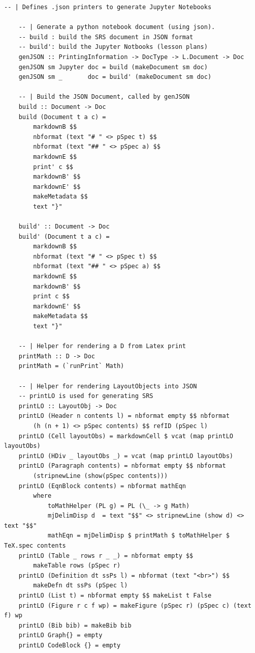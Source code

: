 \begin{lstlisting}[language=haskell1, 
	basicstyle=\linespread{1.1}\small\ttfamily]
	-- | Defines .json printers to generate Jupyter Notebooks
	
	-- | Generate a python notebook document (using json).
	-- build : build the SRS document in JSON format
	-- build': build the Jupyter Notbooks (lesson plans)
	genJSON :: PrintingInformation -> DocType -> L.Document -> Doc
	genJSON sm Jupyter doc = build (makeDocument sm doc)
	genJSON sm _       doc = build' (makeDocument sm doc)
		
	-- | Build the JSON Document, called by genJSON
	build :: Document -> Doc
	build (Document t a c) = 
		markdownB $$
		nbformat (text "# " <> pSpec t) $$
		nbformat (text "## " <> pSpec a) $$
		markdownE $$
		print' c $$
		markdownB' $$
		markdownE' $$
		makeMetadata $$
		text "}" 

	build' :: Document -> Doc
	build' (Document t a c) = 
		markdownB $$
		nbformat (text "# " <> pSpec t) $$
		nbformat (text "## " <> pSpec a) $$
		markdownE $$
		markdownB' $$ 
		print c $$
		markdownE' $$
		makeMetadata $$
		text "}" 

	-- | Helper for rendering a D from Latex print
	printMath :: D -> Doc
	printMath = (`runPrint` Math)
		
	-- | Helper for rendering LayoutObjects into JSON
	-- printLO is used for generating SRS
	printLO :: LayoutObj -> Doc
	printLO (Header n contents l) = nbformat empty $$ nbformat 
		(h (n + 1) <> pSpec contents) $$ refID (pSpec l)
	printLO (Cell layoutObs) = markdownCell $ vcat (map printLO layoutObs)
	printLO (HDiv _ layoutObs _) = vcat (map printLO layoutObs)
	printLO (Paragraph contents) = nbformat empty $$ nbformat 
		(stripnewLine (show(pSpec contents)))
	printLO (EqnBlock contents) = nbformat mathEqn
		where
			toMathHelper (PL g) = PL (\_ -> g Math)
			mjDelimDisp d  = text "$$" <> stripnewLine (show d) <> text "$$" 
			mathEqn = mjDelimDisp $ printMath $ toMathHelper $ TeX.spec contents
	printLO (Table _ rows r _ _) = nbformat empty $$ 
		makeTable rows (pSpec r)
	printLO (Definition dt ssPs l) = nbformat (text "<br>") $$ 
		makeDefn dt ssPs (pSpec l)
	printLO (List t) = nbformat empty $$ makeList t False
	printLO (Figure r c f wp) = makeFigure (pSpec r) (pSpec c) (text f) wp
	printLO (Bib bib) = makeBib bib
	printLO Graph{} = empty 
	printLO CodeBlock {} = empty
		

\end{lstlisting}
